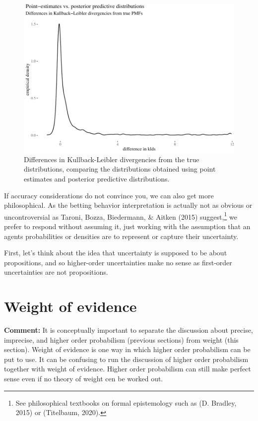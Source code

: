 \documentclass[
  10pt,
  dvipsnames,enabledeprecatedfontcommands]{scrartcl}
\begin{document}
\begin{figure}[H]

\begin{center}\includegraphics[width=0.9\linewidth]{chapter-outline_files/figure-latex/fig:kldsPlots-1} \end{center}
\caption{Differences in Kullback-Leibler divergencies from the true distributions, comparing the distributions obtained using point estimates and posterior predictive distributions.}
\label{fig:kldsPlots}
\end{figure}

If accuracy considerations do not convince you, we can also get more
philosophical. As the betting behavior interpretation is actually not as
obvious or uncontroversial as Taroni, Bozza, Biedermann, \& Aitken
(2015) suggest,\footnote{See philosophical textbooks on formal
  epistemology such as (D. Bradley, 2015) or (Titelbaum, 2020).} we
prefer to respond without assuming it, just working with the assumption
that an agents probabilities or densities are to represent or capture
their uncertainty.

First, let's think about the idea that uncertainty is supposed to be
about propositions, and so higher-order uncertainties make no sense as
first-order uncertainties are not propositions.

\hypertarget{weight-of-evidence}{%
\section{Weight of evidence}\label{weight-of-evidence}}

\textbf{Comment:} It is conceptually important to separate the
discussion about precise, imprecise, and higher order probabilism
(previous sections) from weight (this section). Weight of evidence is
one way in which higher order probabilism can be put to use. It can be
confusing to run the discussion of higher order probabilism together
with weight of evidence. Higher order probabilism can still make perfect
sense even if no theory of weight cen be worked out.
\end{document}
